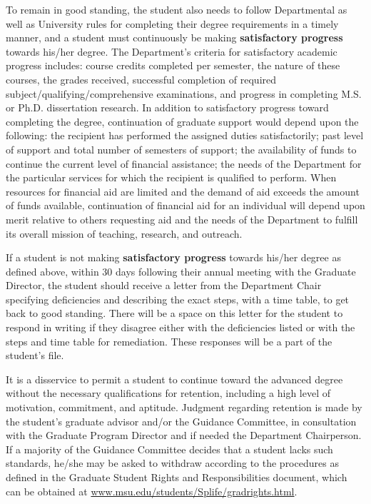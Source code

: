 To remain in good standing, the student also needs to follow
Departmental as well as University rules for completing their degree
requirements in a timely manner, and a student must continuously be
making \textbf{satisfactory progress} towards his/her degree.  The
Department's criteria for satisfactory academic progress includes:
course credits completed per semester, the nature of these courses,
the grades received, successful completion of required
subject/qualifying/comprehensive examinations, and progress in
completing M.S. or Ph.D. dissertation research. In addition to
satisfactory progress toward completing the degree, continuation of
graduate support would depend upon the following: the recipient has
performed the assigned duties satisfactorily; past level of support
and total number of semesters of support; the availability of funds to
continue the current level of financial assistance; the needs of the
Department for the particular services for which the recipient is
qualified to perform.  When resources for financial aid are limited
and the demand of aid exceeds the amount of funds available,
continuation of financial aid for an individual will depend upon merit
relative to others requesting aid and the needs of the Department to
fulfill its overall mission of teaching, research, and outreach.  
 
If a student is not making \textbf{satisfactory progress} towards
his/her degree as defined above, within 30 days following their annual
meeting with the Graduate Director, the student should receive a letter
from the Department Chair specifying deficiencies and describing the
exact steps, with a time table, to get back to good standing.  There
will be a space on this letter for the student to respond in writing
if they disagree either with the deficiencies listed or with the steps
and time table for remediation. These responses will be a part of the
student's file.

It is a disservice to permit a student to continue toward the advanced
degree without the necessary qualifications for retention, including a
high level of motivation, commitment, and aptitude.  Judgment
regarding retention is made by the student's graduate advisor and/or
the Guidance Committee, in consultation with the Graduate Program
Director and if needed the Department Chairperson.  If a majority of
the Guidance Committee decides that a
student lacks such standards, he/she may be asked to withdraw
according to the procedures as defined in the Graduate Student Rights
and Responsibilities document, which can be obtained at
\url{www.msu.edu/students/Splife/gradrights.html}.


